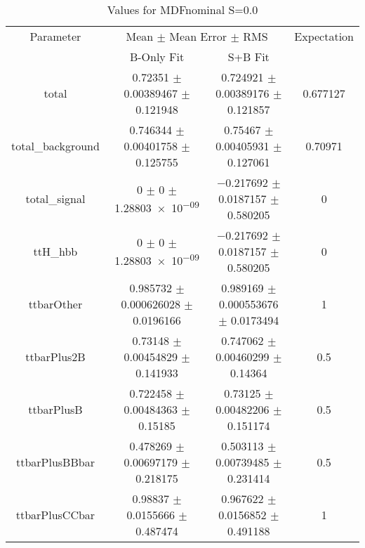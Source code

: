 \begin{table}
\centering
\caption{Values for MDFnominal S=0.0}
\begin{tabular}{cccc}
\toprule
Parameter & \multicolumn{2}{c}{Mean $\pm$ Mean Error $\pm$ RMS} & Expectation\\
 & B-Only Fit & S+B Fit & \\
\midrule
total & \num{0.72351} $\pm$ \num{0.00389467} $\pm$ \num{0.121948} & \num{0.724921} $\pm$ \num{0.00389176} $\pm$ \num{0.121857} & \num{0.677127}\\
total\_background & \num{0.746344} $\pm$ \num{0.00401758} $\pm$ \num{0.125755} & \num{0.75467} $\pm$ \num{0.00405931} $\pm$ \num{0.127061} & \num{0.70971}\\
total\_signal & \num{0} $\pm$ \num{0} $\pm$ \num{1.28803e-09} & \num{-0.217692} $\pm$ \num{0.0187157} $\pm$ \num{0.580205} & \num{0}\\
ttH\_hbb & \num{0} $\pm$ \num{0} $\pm$ \num{1.28803e-09} & \num{-0.217692} $\pm$ \num{0.0187157} $\pm$ \num{0.580205} & \num{0}\\
ttbarOther & \num{0.985732} $\pm$ \num{0.000626028} $\pm$ \num{0.0196166} & \num{0.989169} $\pm$ \num{0.000553676} $\pm$ \num{0.0173494} & \num{1}\\
ttbarPlus2B & \num{0.73148} $\pm$ \num{0.00454829} $\pm$ \num{0.141933} & \num{0.747062} $\pm$ \num{0.00460299} $\pm$ \num{0.14364} & \num{0.5}\\
ttbarPlusB & \num{0.722458} $\pm$ \num{0.00484363} $\pm$ \num{0.15185} & \num{0.73125} $\pm$ \num{0.00482206} $\pm$ \num{0.151174} & \num{0.5}\\
ttbarPlusBBbar & \num{0.478269} $\pm$ \num{0.00697179} $\pm$ \num{0.218175} & \num{0.503113} $\pm$ \num{0.00739485} $\pm$ \num{0.231414} & \num{0.5}\\
ttbarPlusCCbar & \num{0.98837} $\pm$ \num{0.0155666} $\pm$ \num{0.487474} & \num{0.967622} $\pm$ \num{0.0156852} $\pm$ \num{0.491188} & \num{1}\\
\bottomrule
\end{tabular}
\end{table}